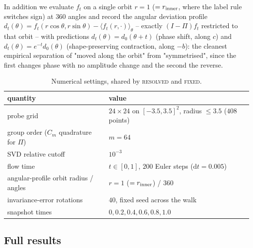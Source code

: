 In addition we evaluate $f_t$ on a single orbit $r=1$ ($=r_{\rm inner}$,
where the label rule switches sign) at $360$ angles and record the angular
deviation profile $d_t(\theta)=f_t(r\cos\theta,r\sin\theta)-\langle
f_t(r,\cdot)\rangle_\theta$ -- exactly $(I-\Pi)f_t$ restricted to that orbit
-- with predictions $d_t(\theta)=d_0(\theta+t)$ (phase shift, along $c$) and
$d_t(\theta)=e^{-t}d_0(\theta)$ (shape-preserving contraction, along $-b$):
the cleanest empirical separation of "moved along the orbit" from
"symmetrised", since the first changes phase with no amplitude change and the
second the reverse.

\begin{table}[h]
\centering
\begin{tabular}{ll}
\toprule
quantity & value \\
\midrule
probe grid & $24\times24$ on $[-3.5,3.5]^2$, radius $\le3.5$ ($408$ points) \\
group order ($C_m$ quadrature for $\Pi$) & $m=64$ \\
SVD relative cutoff & $10^{-3}$ \\
flow time & $t\in[0,1]$, $200$ Euler steps ($\mathrm{d}t=0.005$) \\
angular-profile orbit radius / angles & $r=1$ ($=r_{\rm inner}$) / $360$ \\
invariance-error rotations & $40$, fixed seed across the walk \\
snapshot times & $0,0.2,0.4,0.6,0.8,1.0$ \\
\bottomrule
\end{tabular}
\caption{Numerical settings, shared by \textsc{resolved} and \textsc{fixed}.}
\label{tab:equivariance-flow-settings}
\end{table}

\subsection{Full results}

